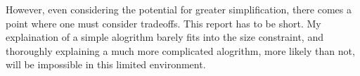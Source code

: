 \documentclass[12pt]{article}
\begin{document}
    However, even considering the potential for greater simplification, there comes a point where one must consider tradeoffs. This report has to be short. My explaination of a simple alogrithm barely fits into the size constraint, and thoroughly explaining a much more complicated alogrithm, more likely than not, will be impossible in this limited environment.
\end{document}

